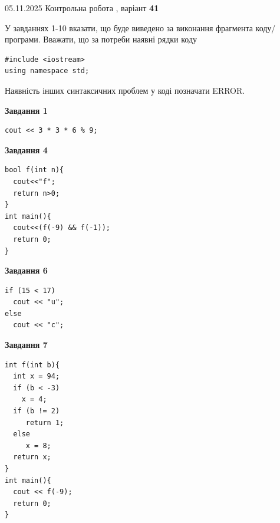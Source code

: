 \documentclass[12pt, ukrainian]{article}
\begin{document}
\newpage

{\Large{05.11.2025 Контрольна робота , варіант  \No \textbf { 41 }\par}}
{
\begin {large}
У завданнях 1-10 вказати, що буде виведено за виконання фрагмента коду/про\-гра\-ми.
Вважати, що за потреби наявні рядки коду
\begin{verbatim}
#include <iostream>
using namespace std;
\end{verbatim}
Наявність інших синтаксичних проблем у коді позначати ERROR.

\begin{minipage}[t]{7.0cm}

\begin{center}
\textbf{Завдання 1}
\end{center}
\vspace{-8mm}

\begin{verbatim}
cout << 3 * 3 * 6 % 9;
\end{verbatim}



\begin{center}
\textbf{Завдання 4}
\end{center}
\vspace{-8mm}

\begin{verbatim}
bool f(int n){
  cout<<"f";
  return n>0;
}
int main(){
  cout<<(f(-9) && f(-1));
  return 0;
}
\end{verbatim}



\begin{center}
\textbf{Завдання 6}
\end{center}
\vspace{-8mm}

\begin{verbatim}
if (15 < 17)
  cout << "u";
else
  cout << "c";
\end{verbatim}



\begin{center}
\textbf{Завдання 7}
\end{center}
\vspace{-8mm}

\begin{verbatim}
int f(int b){
  int x = 94;
  if (b < -3)
    x = 4;
  if (b != 2)
     return 1;
  else
     x = 8;
  return x;
}
int main(){
  cout << f(-9);
  return 0;
}
\end{verbatim}


\end{minipage}
\end{large}}
\end{document}
